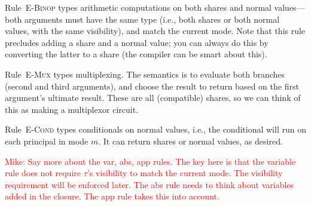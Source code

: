 \documentclass[10pt]{article}
\newcommand{\rulelab}[1]{{\small \textsc{#1}}}
\newcommand{\kw}[1]{\ensuremath{\mathtt{#1}}}
\newcommand{\isec}{\ensuremath{\mathtt{pmap}}}
\newcommand{\sectyp}[3]{\ensuremath{{#1} \{~{#2}:{#3}~\}}}
\newcommand{\epar}[2]{\ensuremath{\kw{par}~{#1}~{#2}}}
\newcommand{\econd}[3]{\ensuremath{\kw{if}~{#1}~\kw{then}~{#2}~\kw{else}~{#3}}}
\newcommand{\mwh}[1]{\textcolor{red}{Mike: #1}}
\begin{document}
Rule~\rulelab{E-Binop} types arithmetic computations on both shares
and normal values---both arguments must have the same type (i.e., both
shares or both normal values, with the same visibility), and match the
current mode. Note that this rule precludes adding a 
share and a normal value; you can always do this by converting the
latter to a share (the compiler can be smart about this).

Rule~\rulelab{E-Mux} types multiplexing. The semantics is to evaluate
both branches (second and third arguments), and choose the result to
return based on the first argument's ultimate result. These are all
(compatible) shares, so we can think of this as making a multiplexor
circuit. 

Rule~\rulelab{E-Cond} types conditionals on normal values, i.e., the
conditional will run on each principal in mode $m$. It can return
shares or normal values, as desired. 

\mwh{Say more about the var, abs, app rules. The key here is that the
  variable rule does not require $\tau$'s visibility to match the
  current mode. The visibility requirement will be enforced later. The
  abs rule needs to think about variables added in the closure. The
  app rule takes this into account.}

\end{document}
